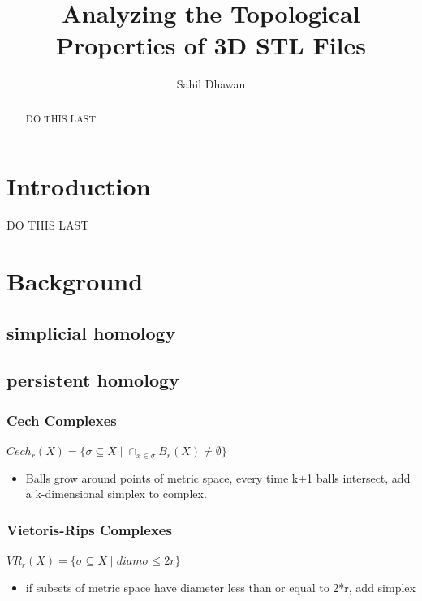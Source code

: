 \documentclass{article}
\title{Analyzing the Topological Properties of 3D STL Files}
\author{Sahil Dhawan}
\begin{document}
\newcommand{\setbackgroundcolor}{\pagecolor[rgb]{0,0,0}}  
\newcommand{\settextcolor}{\color[rgb]{1,1,1}}
\newcommand{\invertbackgroundtext}{\setbackgroundcolor\settextcolor}

\invertbackgroundtext


\maketitle
\begin{abstract}
DO THIS LAST
\end{abstract}

\section{Introduction}

DO THIS LAST

\section{Background}

\subsection{simplicial homology}

\cite{Hatcher_2001}

\subsection{persistent homology}

\subsubsection{Cech Complexes}
$Cech_{r}(X) = \{\sigma \subseteq X \mid \cap_{x \in \sigma} B_{r}(X) \not= \emptyset\}$
\begin{itemize}
\item Balls grow around points of metric space, every time k+1 balls intersect, add a k-dimensional simplex to complex.
\end{itemize}

\subsubsection{Vietoris-Rips Complexes}
$VR_{r}(X) = \{\sigma \subseteq X \mid diam\sigma \leq 2r \}$
\begin{itemize}
\item if subsets of metric space have diameter less than or equal to 2*r, add simplex
\end{itemize}
\end{document}
